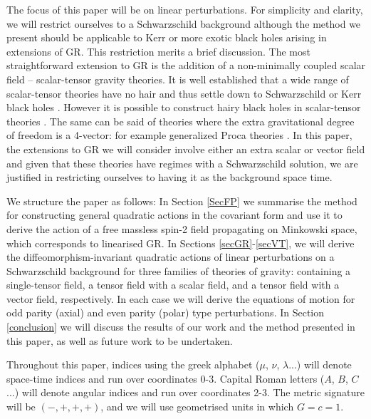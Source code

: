 \documentclass[10pt,twocolumn,preprintnumbers,amsmath,amssymb,nofootinbib
,superscriptaddress]{revtex4-1}
\begin{document}
The focus of this paper will be on linear perturbations. For simplicity and clarity, we will restrict ourselves to a Schwarzschild background although the method we present should be applicable to Kerr or more exotic black holes arising in extensions of GR. This restriction merits a brief discussion. The most straightforward extension to GR is the addition of a non-minimally coupled scalar field -- scalar-tensor gravity theories. It is well established that a wide range of scalar-tensor theories have no hair and thus settle down to Schwarzschild or Kerr black holes \cite{2012PhRvL.108h1103S}. However it is possible to construct hairy black holes in scalar-tensor theories \cite{Sotiriou:2013qea}. The same can be said of theories where the extra gravitational degree of freedom is a 4-vector: for example generalized Proca theories \cite{Chagoya:2016aar,2017JCAP...08..024H}. In this paper, the extensions to GR we will consider involve either an extra scalar or vector field and given that these theories have regimes with a Schwarzschild solution, we are justified in restricting ourselves to having it as the background space time.

We structure the paper as follows: In Section \ref{SecFP} we summarise the method for constructing general quadratic actions in the covariant form and use it to derive the action of a free massless spin-2 field propagating on Minkowski space, which corresponds to linearised GR. In Sections \ref{secGR}-\ref{secVT}, we will derive the diffeomorphism-invariant quadratic actions of linear perturbations on a Schwarzschild background for three families of theories of gravity: containing a single-tensor field, a tensor field with a scalar field, and a tensor field with a vector field, respectively. In each case we will derive the equations of motion for odd parity (axial) and even parity (polar) type perturbations. In Section \ref{conclusion} we will discuss the results of our work and the method presented in this paper, as well as future work to be undertaken. 

Throughout this paper, indices using the greek alphabet ($\mu$, $\nu$, $\lambda$...) will denote space-time indices and run over coordinates 0-3. Capital Roman letters ($A$, $B$, $C$...) will denote angular indices and run over coordinates 2-3. The metric signature will be $(-,+,+,+)$, and we will use geometrised units in which $G=c=1$.


\end{document}

